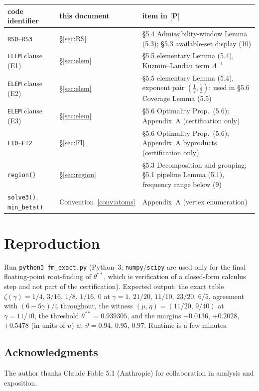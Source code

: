 \documentclass[11pt]{article}
\theoremstyle{remark}
\newcommand{\code}[1]{\texttt{#1}}
\begin{document}
\begin{center}
\small
\begin{center}
\small
\begin{tabular}{@{}ll>{\raggedright\arraybackslash}p{}@{}}
\toprule
code identifier & this document & item in [P]\\
\midrule
\code{RS0}--\code{RS3} & \S\ref{sec:RS} & \S5.4 Admissibility-window Lemma (5.3);
\S5.3 available-set display (10)\\
\code{ELEM} clause (E1) & \S\ref{sec:elem} & \S5.5 elementary Lemma (5.4),
Kuzmin--Landau term $\Lambda^{-1}$\\
\code{ELEM} clause (E2) & \S\ref{sec:elem} & \S5.5 elementary Lemma (5.4),
exponent pair $(\tfrac12,\tfrac12)$; used in \S5.6 Coverage Lemma (5.5)\\
\code{ELEM} clause (E3) & \S\ref{sec:elem} & \S5.6 Optimality Prop.\ (5.6);
Appendix~A (certification only)\\
\code{FI0}--\code{FI2} & \S\ref{sec:FI} & \S5.6 Optimality Prop.\ (5.6);
Appendix~A byproducts (certification only)\\
\code{region()} & \S\ref{sec:region} & \S5.3 Decomposition and grouping;
\S5.1 pipeline Lemma (5.1), frequency range below (9)\\
\code{solve3()}, \code{min\_beta()} & Convention~\ref{conv:atoms} &
Appendix~A (vertex enumeration)\\
\bottomrule
\end{tabular}
\end{center}
\end{center}

\section{Reproduction}\label{sec:repro}

Run \code{python3 fm\_exact.py} (Python~3; \code{numpy}/\code{scipy}
are used only for the final floating-point root-finding of
$\theta^{\ast\ast}$, which is verification of a closed-form calculus step and
not part of the certification). Expected output: the exact table
$\zeta(\gamma)=1/4,\,3/16,\,1/8,\,1/16,\,0$ at
$\gamma=1,\,21/20,\,11/10,\,23/20,\,6/5$, agreement with
$(6-5\gamma)/4$ throughout, the witness
$(\mu,\eta)=(11/20,\,9/40)$ at $\gamma=11/10$, the threshold
$\theta^{\ast\ast}=0.939305$, and the margins $+0.0136$, $+0.2028$,
$+0.5478$ (in units of $u$) at $\vartheta=0.94,\,0.95,\,0.97$.
Runtime is a few minutes.

\subsection*{Acknowledgments}
The author thanks Claude Fable 5.1 (Anthropic) for collaboration in analysis and exposition.
\end{document}
